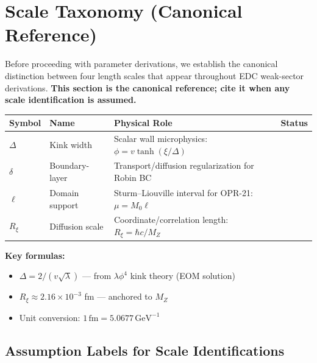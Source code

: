 \section{Scale Taxonomy (Canonical Reference)}
\label{sec:scale_taxonomy}

Before proceeding with parameter derivations, we establish the canonical distinction
between four length scales that appear throughout EDC weak-sector derivations.
\textbf{This section is the canonical reference; cite it when any scale identification
is assumed.}

\begin{tcolorbox}[colback=blue!3!white, colframe=blue!40!black,
    title=\textbf{EDC Scale Taxonomy --- Canonical Table}]
\label{box:scale_taxonomy}

\begin{center}
\renewcommand{\arraystretch}{1.3}
\begin{tabular}{lllc}
\toprule
\textbf{Symbol} & \textbf{Name} & \textbf{Physical Role} & \textbf{Status} \\
\midrule
$\Delta$ & Kink width & Scalar wall microphysics: $\phi = v\tanh(\xi/\Delta)$ & \tagDer{} \\
$\delta$ & Boundary-layer & Transport/diffusion regularization for Robin BC & \tagP{} \\
$\ell$ & Domain support & Sturm--Liouville interval for OPR-21: $\mu = M_0\ell$ & \tagP{} \\
$R_\xi$ & Diffusion scale & Coordinate/correlation length: $R_\xi = \hbar c/M_Z$ & \tagBL{} \\
\bottomrule
\end{tabular}
\end{center}

\medskip
\textbf{Key formulas:}
\begin{itemize}[nosep]
    \item $\Delta = 2/(v\sqrt{\lambda})$ \tagDer{} --- from $\lambda\phi^4$ kink theory (EOM solution)
    \item $R_\xi \approx 2.16 \times 10^{-3}$ fm \tagBL{} --- anchored to $M_Z$
    \item Unit conversion: $1\,\mathrm{fm} = 5.0677\,\mathrm{GeV}^{-1}$
\end{itemize}
\end{tcolorbox}

\subsection{Assumption Labels for Scale Identifications}
\label{subsec:assumption_labels}

